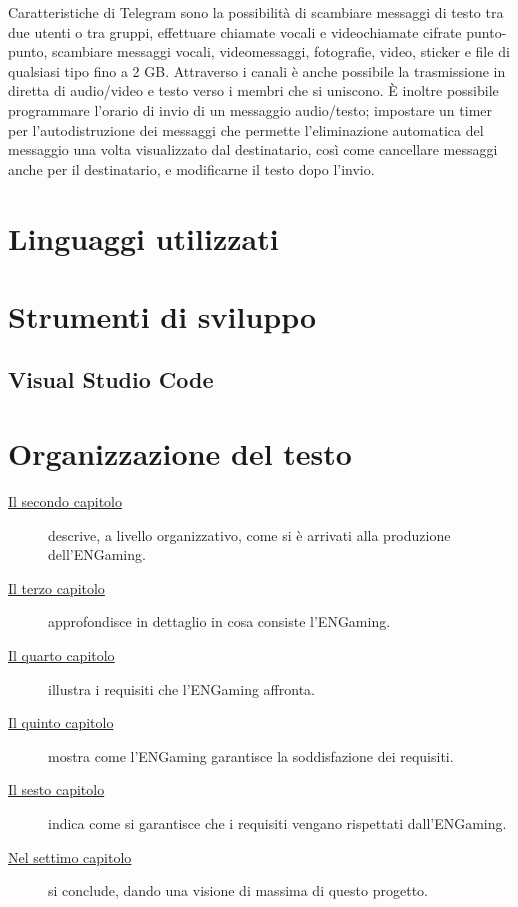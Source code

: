 Caratteristiche di Telegram sono la possibilità di scambiare messaggi di testo tra due utenti o tra gruppi, effettuare chiamate vocali e videochiamate cifrate punto-punto, scambiare messaggi vocali, videomessaggi, fotografie, video, sticker e file di qualsiasi tipo fino a 2 GB. Attraverso i canali è anche possibile la trasmissione in diretta di audio/video e testo verso i membri che si uniscono. È inoltre possibile programmare l’orario di invio di un messaggio audio/testo; impostare un timer per l'autodistruzione dei messaggi che permette l'eliminazione automatica del messaggio una volta visualizzato dal destinatario, così come cancellare messaggi anche per il destinatario, e modificarne il testo dopo l'invio.

\section{Linguaggi utilizzati}

\section{Strumenti di sviluppo}

\subsection{Visual Studio Code}

\section{Organizzazione del testo}

\begin{description}
    \item[{\hyperref[cap:processi-metodologie]{Il secondo capitolo}}] descrive, a livello organizzativo, come si è arrivati alla produzione dell'ENGaming.
    
    \item[{\hyperref[cap:descrizione-stage]{Il terzo capitolo}}] approfondisce in dettaglio in cosa consiste l'ENGaming.
    
    \item[{\hyperref[cap:analisi-requisiti]{Il quarto capitolo}}] illustra i requisiti che l'ENGaming affronta.
    
    \item[{\hyperref[cap:progettazione-codifica]{Il quinto capitolo}}] mostra come l'ENGaming garantisce la soddisfazione dei requisiti.
    
    \item[{\hyperref[cap:verifica-validazione]{Il sesto capitolo}}] indica come si garantisce che i requisiti vengano rispettati dall'ENGaming.
    
    \item[{\hyperref[cap:conclusioni]{Nel settimo capitolo}}] si conclude, dando una visione di massima di questo progetto.
\end{description}

